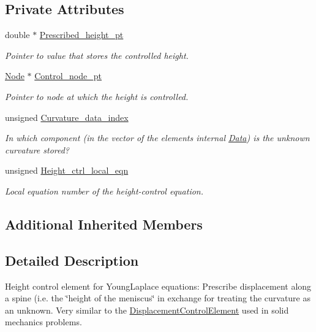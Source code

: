 \subsection*{Private Attributes}
\begin{DoxyCompactItemize}
\item 
double $\ast$ \hyperlink{classoomph_1_1HeightControlElement_a84d4b72f7ce6ed722a5deac748ec874b}{Prescribed\+\_\+height\+\_\+pt}
\begin{DoxyCompactList}\small\item\em Pointer to value that stores the controlled height. \end{DoxyCompactList}\item 
\hyperlink{classoomph_1_1Node}{Node} $\ast$ \hyperlink{classoomph_1_1HeightControlElement_a7950b34b4d99cf59df12a1c458b42540}{Control\+\_\+node\+\_\+pt}
\begin{DoxyCompactList}\small\item\em Pointer to node at which the height is controlled. \end{DoxyCompactList}\item 
unsigned \hyperlink{classoomph_1_1HeightControlElement_a2e03540694fb3d599770106ca460281e}{Curvature\+\_\+data\+\_\+index}
\begin{DoxyCompactList}\small\item\em In which component (in the vector of the element\textquotesingle{}s internal \hyperlink{classoomph_1_1Data}{Data}) is the unknown curvature stored? \end{DoxyCompactList}\item 
unsigned \hyperlink{classoomph_1_1HeightControlElement_adbcff51a8787697ba2179442b9c2a753}{Height\+\_\+ctrl\+\_\+local\+\_\+eqn}
\begin{DoxyCompactList}\small\item\em Local equation number of the height-\/control equation. \end{DoxyCompactList}\end{DoxyCompactItemize}
\subsection*{Additional Inherited Members}


\subsection{Detailed Description}
Height control element for Young\+Laplace equations\+: Prescribe displacement along a spine (i.\+e. the \char`\"{}height of the meniscus\char`\"{} in exchange for treating the curvature as an unknown. Very similar to the \hyperlink{classoomph_1_1DisplacementControlElement}{Displacement\+Control\+Element} used in solid mechanics problems. 

